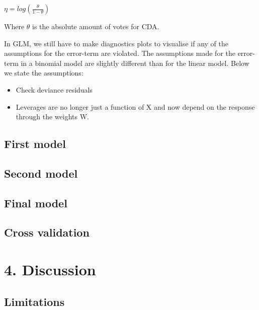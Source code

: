 \documentclass[11pt,]{article}
\begin{document}
\(\eta = log(\frac{\theta}{1 - \theta})\)

Where \(\theta\) is the absolute amount of votes for CDA.

In GLM, we still have to make diagnostics plots to visualise if any of
the assumptions for the error-term are violated. The assumptions made
for the error-term in a binomial model are slightly different than for
the linear model. Below we state the assumptions:

\begin{itemize}
\item[] Check deviance residuals
\item[] Leverages are no longer just a function of X and now depend on the response through the weights W.
\end{itemize}

\subsection{First model}\label{first-model-1}

\subsection{Second model}\label{second-model}

\subsection{Final model}\label{final-model-1}

\subsection{Cross validation}\label{cross-validation-1}

\section{4. Discussion}\label{discussion}

\subsection{Limitations}\label{limitations}
\end{document}
